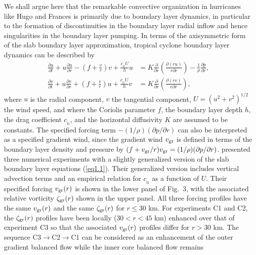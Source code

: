 \documentclass[10pt]{article}
\newcommand{\cD}{c_{_\mathrm{D}}}
\begin{document}
     We shall argue here that the remarkable convective organization in
hurricanes like Hugo and Frances is primarily due to boundary
layer dynamics, in particular to the formation of discontinuities in the
boundary layer radial inflow and hence singularities in the boundary layer
pumping. In terms of the axisymmetric form of the slab boundary layer
approximation, tropical cyclone boundary layer dynamics can be described by
\begin{equation}                                  %
  \begin{split}
     \frac{\partial u}{\partial t} + u\frac{\partial u}{\partial r}
      - \left(f + \frac{v}{r}\right)v + \frac{\cD U}{h}u
     &= K\frac{\partial}{\partial r}\left(\frac{\partial(ru)}{r\partial r}\right)
      - \frac{1}{\rho}\frac{\partial p}{\partial r},  \\
     \frac{\partial v}{\partial t} + u\frac{\partial v}{\partial r}
     + \left(f + \frac{v}{r}\right)u + \frac{\cD U}{h}v
     &= K\frac{\partial}{\partial r}\left(\frac{\partial(rv)}{r\partial r}\right),
  \end{split}
\label{eq1.1}
\end{equation}
where $u$ is the radial component, $v$ the tangential component,
$U=(u^2+v^2)^{1/2}$ the wind speed, and where the Coriolis parameter $f$,
the boundary layer depth $h$, the drag coefficient $\cD$, and the horizontal
diffusivity $K$ are assumed to be constants. The specified forcing term
$-(1/\rho)(\partial p/\partial r)$ can also be interpreted as a specified
gradient wind, since the gradient wind $v_{\rm gr}$ is defined in terms
of the boundary layer density and pressure by $(f+v_{\rm gr}/r)v_{\rm gr}
=(1/\rho)(\partial p/\partial r)$.  \citet{slocum14} presented three
numerical experiments with a slightly generalized version of the slab
boundary layer equations (\ref{eq1.1}). Their generalized version includes
vertical advection terms and an empirical relation for $\cD$ as a function
of $U$. Their specified forcing $v_{\rm gr}(r)$ is shown in the lower panel
of Fig.~3, with the associated relative vorticity $\zeta_{\rm gr}(r)$ shown
in the upper panel.  All three forcing profiles
have the same $v_{\rm gr}(r)$ and the same $\zeta_{\rm gr}(r)$ for
$r \le 30$ km. For experiments C1 and C2, the $\zeta_{\rm gr}(r)$ profiles
have been locally ($30 < r < 45$ km) enhanced over that of experiment C3
so that the associated $v_{\rm gr}(r)$ profiles differ for $r > 30$ km.
The sequence C3$\to$C2$\to$C1 can be considered as an enhancement of the
outer gradient balanced flow while the inner core balanced flow remains
\end{document}
